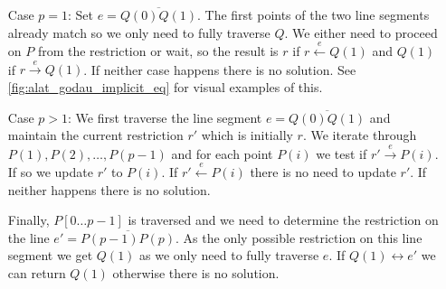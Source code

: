 \begin{itemize}
  \item[Case \(p = 1\): ] Set \(e = \overline{Q(0)Q(1)}\). The first points of the two line segments already match so we only need to fully traverse \(Q\). We either need to proceed on \(P\) from the restriction or wait, so the result is \(r\) if \(r \overset e\leftarrow Q(1)\) and \(Q(1)\) if \(r \overset e\rightarrow Q(1)\). If neither case happens there is no solution. 
    See \cref{fig:alat_godau_implicit_eq} for visual examples of this.
  \item[Case \(p > 1\): ] We first traverse the line segment \(e = \overline{Q(0)Q(1)}\) and maintain the current restriction \(r'\) which is initially \(r\). We iterate through \(P(1), P(2), \dots, P(p-1)\) and for each point \(P(i)\) we test if \(r' \overset e\rightarrow P(i)\). If so we update \(r'\) to \(P(i)\). If \(r' \overset e\leftarrow P(i)\) there is no need to update \(r'\). If neither happens there is no solution. 

    Finally, \(P[0\dots p-1]\) is traversed and we need to determine the restriction on the line \(e'=\overline{P(p-1)P(p)}\). As the only possible restriction on this line segment we get \(Q(1)\) as we only need to fully traverse \(e\). If \(Q(1) \leftrightarrow e'\) we can return \(Q(1)\) otherwise there is no solution.
\end{itemize}

